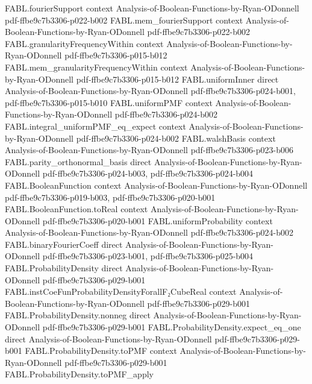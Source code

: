 \begin{theorem}
\proofstep
  {FABL.fourierSupport}
  {context}
  {Analysis-of-Boolean-Functions-by-Ryan-ODonnell}
  {pdf-ffbe9c7b3306-p022-b002}
\proofstep
  {FABL.mem_fourierSupport}
  {context}
  {Analysis-of-Boolean-Functions-by-Ryan-ODonnell}
  {pdf-ffbe9c7b3306-p022-b002}
\proofstep
  {FABL.granularityFrequencyWithin}
  {context}
  {Analysis-of-Boolean-Functions-by-Ryan-ODonnell}
  {pdf-ffbe9c7b3306-p015-b012}
\proofstep
  {FABL.mem_granularityFrequencyWithin}
  {context}
  {Analysis-of-Boolean-Functions-by-Ryan-ODonnell}
  {pdf-ffbe9c7b3306-p015-b012}
\proofstep
  {FABL.uniformInner}
  {direct}
  {Analysis-of-Boolean-Functions-by-Ryan-ODonnell}
  {pdf-ffbe9c7b3306-p024-b001,
    pdf-ffbe9c7b3306-p015-b010}
\proofstep
  {FABL.uniformPMF}
  {context}
  {Analysis-of-Boolean-Functions-by-Ryan-ODonnell}
  {pdf-ffbe9c7b3306-p024-b002}
\proofstep
  {FABL.integral_uniformPMF_eq_expect}
  {context}
  {Analysis-of-Boolean-Functions-by-Ryan-ODonnell}
  {pdf-ffbe9c7b3306-p024-b002}
\proofstep
  {FABL.walshBasis}
  {context}
  {Analysis-of-Boolean-Functions-by-Ryan-ODonnell}
  {pdf-ffbe9c7b3306-p023-b006}
\proofstep
  {FABL.parity_orthonormal_basis}
  {direct}
  {Analysis-of-Boolean-Functions-by-Ryan-ODonnell}
  {pdf-ffbe9c7b3306-p024-b003,
    pdf-ffbe9c7b3306-p024-b004}
\proofstep
  {FABL.BooleanFunction}
  {context}
  {Analysis-of-Boolean-Functions-by-Ryan-ODonnell}
  {pdf-ffbe9c7b3306-p019-b003,
    pdf-ffbe9c7b3306-p020-b001}
\proofstep
  {FABL.BooleanFunction.toReal}
  {context}
  {Analysis-of-Boolean-Functions-by-Ryan-ODonnell}
  {pdf-ffbe9c7b3306-p020-b001}
\proofstep
  {FABL.uniformProbability}
  {context}
  {Analysis-of-Boolean-Functions-by-Ryan-ODonnell}
  {pdf-ffbe9c7b3306-p024-b002}
\proofstep
  {FABL.binaryFourierCoeff}
  {direct}
  {Analysis-of-Boolean-Functions-by-Ryan-ODonnell}
  {pdf-ffbe9c7b3306-p023-b001,
    pdf-ffbe9c7b3306-p025-b004}
\proofstep
  {FABL.ProbabilityDensity}
  {direct}
  {Analysis-of-Boolean-Functions-by-Ryan-ODonnell}
  {pdf-ffbe9c7b3306-p029-b001}
\proofstep
  {FABL.instCoeFunProbabilityDensityForallF₂CubeReal}
  {context}
  {Analysis-of-Boolean-Functions-by-Ryan-ODonnell}
  {pdf-ffbe9c7b3306-p029-b001}
\proofstep
  {FABL.ProbabilityDensity.nonneg}
  {direct}
  {Analysis-of-Boolean-Functions-by-Ryan-ODonnell}
  {pdf-ffbe9c7b3306-p029-b001}
\proofstep
  {FABL.ProbabilityDensity.expect_eq_one}
  {direct}
  {Analysis-of-Boolean-Functions-by-Ryan-ODonnell}
  {pdf-ffbe9c7b3306-p029-b001}
\proofstep
  {FABL.ProbabilityDensity.toPMF}
  {context}
  {Analysis-of-Boolean-Functions-by-Ryan-ODonnell}
  {pdf-ffbe9c7b3306-p029-b001}
\proofstep
  {FABL.ProbabilityDensity.toPMF_apply}

\end{theorem}
